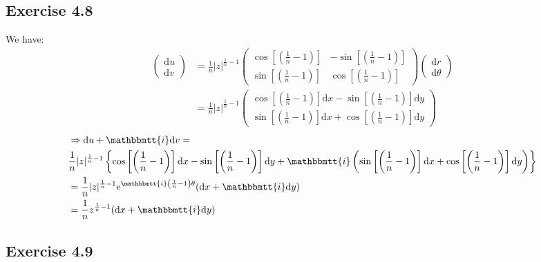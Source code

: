 \documentclass[]{ctexart}
\newcommand{\mi}{\mathbbmtt{i}}
\newcommand{\di}{\mathrm{d}}
\newcommand{\me}{\mathrm{e}}
\begin{document}
	\subsection{Exercise 4.8}
		We have: 
			\begin{equation*}
			\begin{aligned}
				\begin{pmatrix}
					\di u\\
					\di v
				\end{pmatrix}
				&=\frac{1}{n}|z|^{\frac{1}{n}-1}
				\begin{pmatrix}
					\cos \left[\left(\frac{1}{n}-1\right)\right] & -\sin \left[\left(\frac{1}{n}-1\right)\right]\\
					 \sin \left[\left(\frac{1}{n}-1\right)\right]& \cos \left[\left(\frac{1}{n}-1\right)\right]
				\end{pmatrix}
				\begin{pmatrix}
					\di r\\
					\di \theta
				\end{pmatrix}\\
				&=\frac{1}{n}|z|^{\frac{1}{n}-1}
				\begin{pmatrix}
					\cos \left[\left(\frac{1}{n}-1\right)\right]\di x-\sin \left[\left(\frac{1}{n}-1\right)\right]\di y\\
					\sin \left[\left(\frac{1}{n}-1\right)\right]\di x+ \cos \left[\left(\frac{1}{n}-1\right)\right]\di y
				\end{pmatrix}
			\end{aligned}
			\end{equation*}
			\begin{equation*}
			\begin{aligned}
				&\Rightarrow \di u+\mi \di v=\\
				&\frac{1}{n}|z|^{\frac{1}{n}-1}\left\{\cos \left[\left(\frac{1}{n}-1\right)\right]\di x-\sin \left[\left(\frac{1}{n}-1\right)\right]\di y+\mi \left(\sin \left[\left(\frac{1}{n}-1\right)\right]\di x+ \cos \left[\left(\frac{1}{n}-1\right)\right]\di y\right)\right\}\\
				&=\frac{1}{n}|z|^{\frac{1}{n}-1}\me ^{\mi \left(\frac{1}{n}-1\right)\theta}(\di x+\mi \di y)\\
				&=\frac{1}{n}z^{\frac{1}{n}-1}(\di x+\mi \di y)
			\end{aligned}
			\end{equation*}
			
	\subsection{Exercise 4.9}
\end{document}
